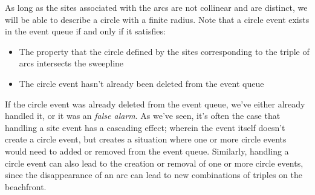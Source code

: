 \documentclass[12pt,twoside]{reedthesis}
\begin{document}

      As long as the sites associated with the arcs are not collinear and are distinct, we will be able to describe a circle with a finite radius. Note that a circle event exists in the event queue if and only if it satisfies:
      \begin{itemize}
      \item The property that the circle defined by the sites corresponding to the triple of arcs intersects the sweepline
      \item The circle event hasn't already been deleted from the event queue
      \end{itemize}\par
      If the circle event was already deleted from the event queue, we've either already handled it, or it was an \emph{false alarm}. As we've seen, it's often the case that handling a site event has a cascading effect; wherein the event itself doesn't create a circle event, but creates a situation where one or more circle events would need to added or removed from the event queue. Similarly, handling a circle event can also lead to the creation or removal of one or more circle events, since the disappearance of an arc can lead to new combinations of triples on the beachfront.\par
\end{document}

